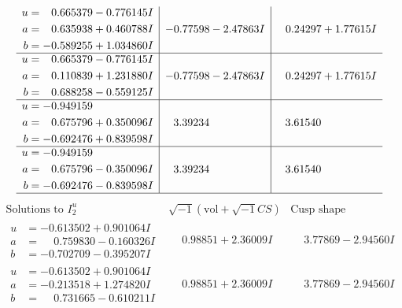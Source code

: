 \documentclass[1p]{elsarticle_modified}
\theoremstyle{definition}
\newcommand{\I}{\sqrt{-1}}
\begin{document}
$$\begin{array}{c|c|c}
\begin{aligned}
u &= \phantom{-}0.665379 - 0.776145 I \\
a &= \phantom{-}0.635938 + 0.460788 I \\
b &= -0.589255 + 1.034860 I\end{aligned}
 & -0.77598 - 2.47863 I & \phantom{-}0.24297 + 1.77615 I \\ \hline\begin{aligned}
u &= \phantom{-}0.665379 - 0.776145 I \\
a &= \phantom{-}0.110839 + 1.231880 I \\
b &= \phantom{-}0.688258 - 0.559125 I\end{aligned}
 & -0.77598 - 2.47863 I & \phantom{-}0.24297 + 1.77615 I \\ \hline\begin{aligned}
u &= -0.949159\phantom{ +0.000000I} \\
a &= \phantom{-}0.675796 + 0.350096 I \\
b &= -0.692476 + 0.839598 I\end{aligned}
 & \phantom{-}3.39234\phantom{ +0.000000I} & \phantom{-}3.61540\phantom{ +0.000000I} \\ \hline\begin{aligned}
u &= -0.949159\phantom{ +0.000000I} \\
a &= \phantom{-}0.675796 - 0.350096 I \\
b &= -0.692476 - 0.839598 I\end{aligned}
 & \phantom{-}3.39234\phantom{ +0.000000I} & \phantom{-}3.61540\phantom{ +0.000000I}\\
 \hline 
 \end{array}$$\newpage$$\begin{array}{c|c|c}  
\text{Solutions to }I^u_{2}& \I (\text{vol} + \sqrt{-1}CS) & \text{Cusp shape}\\
 \hline 
\begin{aligned}
u &= -0.613502 + 0.901064 I \\
a &= \phantom{-}0.759830 - 0.160326 I \\
b &= -0.702709 - 0.395207 I\end{aligned}
 & \phantom{-}0.98851 + 2.36009 I & \phantom{-}3.77869 - 2.94560 I \\ \hline\begin{aligned}
u &= -0.613502 + 0.901064 I \\
a &= -0.213518 + 1.274820 I \\
b &= \phantom{-}0.731665 - 0.610211 I\end{aligned}
 & \phantom{-}0.98851 + 2.36009 I & \phantom{-}3.77869 - 2.94560 I \\ \hline\begin{aligned}

\end{aligned}
\end{array}$$
\end{document}
